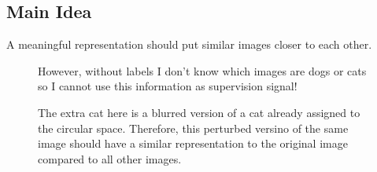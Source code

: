 \documentclass[11pt]{article}
\begin{document}
\subsection{Main Idea}

A meaningful representation should put similar images closer to each other.

\begin{figure}[H]
    \centering
    \caption*{However, without labels I don't know which images are dogs or cats so I cannot use this information as supervision signal!}
\end{figure}

\begin{figure}[H]
    \centering
    \caption*{The extra cat here is a blurred version of a cat already assigned to the circular space. Therefore, this perturbed versino of the same image should have a similar representation to the original image compared to all other images.}
\end{figure}
\end{document}

